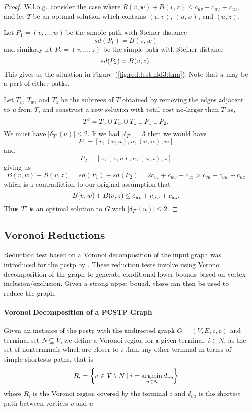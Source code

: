 \begin{proof}   
  W.l.o.g.\ consider the case where $B(v,w) + B(v,z) \leq c_{uv} + c_{uw} + c_{uz}$,
  and let $T$ be an optimal solution which contains $(u,v)$, $(u,w)$, and $(u,z)$.

  Let $P_1 = (v, ..., w)$ be the simple path with Steiner distance
  $$sd(P_1) = B(v,w)$$
  and similarly let $P_2 = (v, ..., z)$ be the simple path with Steiner distance
  $$sd(P_2) = B(v,z)\mathnormal{.}$$
  This gives us the situation in Figure~(\ref{fig:red:test:ntd3:thm}). Note that $u$ may be a part of either paths.

  Let $T_v$, $T_w$, and $T_z$ be the subtrees of $T$ obtained by
  removing the edges adjacent to $u$ from $T$, and construct a new solution with
   total cost no-larger than $T$ as,
   $$T' = T_v \cup T_w \cup T_z \cup P_1 \cup P_2\mathnormal{.}$$
   We must have $|\delta_{T'}(u)| \leq 2$. If we had $|\delta_{T'}| = 3$ then
   we would have
   $$P_1 = \left[v, (v,u), u, (u,w), w \right]$$
   and
   $$P_2 = \left[v, (v,u), u, (u,z), z \right]$$
   giving us
   $$B(v,w) + B(v, z) = sd(P_1) + sd(P_2) = 2 c_{vu} + c_{uw} + c_{uz} > c_{vu} + c_{uw} + c_{uz}$$
   which is a contradiction to our original assumption that
   $$B(v,w) + B(v,z) \leq c_{uv} + c_{uw} + c_{uz}\mathnormal{.}$$
   Thus $T'$ is an optimal solution to $G$ with $|\delta_{T'}(u)| \leq 2$.
\end{proof}

\subsection{Voronoi Reductions}

Reduction test based on a Voronoi decomposition of the input graph was introduced for the
\gls{pcstp} by \citet{gamrath2017scip}. These reduction tests
involve using Voronoi decomposition of the graph to generate conditional lower bounds based on
vertex inclusion/exclusion. Given a strong upper bound, these can then be used
to reduce the graph.

\paragraph{Voronoi Decomposition of a PCSTP Graph}

Given an instance of the \gls{pcstp} with the undirected graph $G = (V, E, c, p)$ and terminal set
$N \subseteq V$, we define a Voronoi region for a given terminal, $i \in N$, as the set of nonterminals
which are closer to $i$ than any other terminal in terms of simple shortests paths, that is,
$$R_i = \left\{v \in V \setminus N \mid i = \operatorname*{argmin}_{u \in N} d_{vu}\right\}$$
where $R_i$ is the Voronoi region covered by the terminal $i$ and $d_{vu}$ is the shortest path between vertices
$v$ and $u$.

